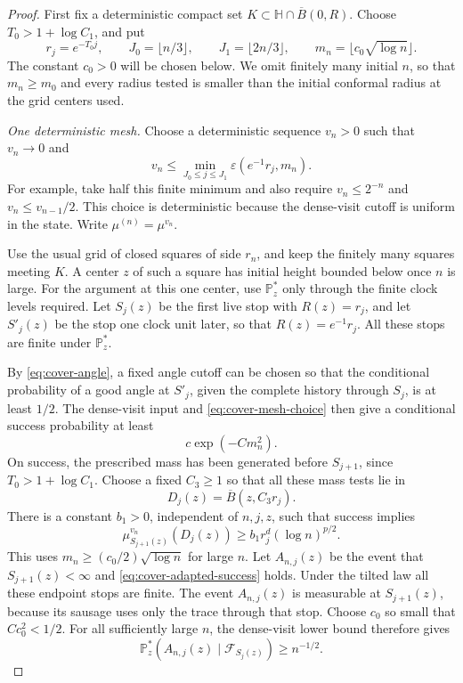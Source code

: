 \documentclass[11pt]{article}
\theoremstyle{definition}
\theoremstyle{remark}
\numberwithin{equation}{section}
\begin{document}
\begin{proof}
First fix a deterministic compact set
\(K\subset\mathbb H\cap\overline B(0,R)\).
Choose \(T_0>1+\log C_1\), and put
\[
 r_j=e^{-T_0j},\qquad
 J_0=\lfloor n/3\rfloor,\qquad J_1=\lfloor2n/3\rfloor,
 \qquad m_n=\lfloor c_0\sqrt{\log n}\rfloor.
\]
The constant \(c_0>0\) will be chosen below.  We omit finitely many
initial \(n\), so that \(m_n\ge m_0\) and every radius tested is
smaller than the initial conformal radius at the grid centers used.

\emph{One deterministic mesh.}
Choose a deterministic sequence \(v_n>0\) such that \(v_n\to0\)
and
\begin{equation}
 v_n\le\min_{J_0\le j\le J_1}
              \varepsilon(e^{-1}r_j,m_n).
 \label{eq:cover-mesh-choice}
\end{equation}
For example, take half this finite minimum and also require
\(v_n\le2^{-n}\) and \(v_n\le v_{n-1}/2\).  This choice is
deterministic because the dense-visit cutoff is uniform in the
state.  Write \(\mu^{(n)}=\mu^{v_n}\).

Use the usual grid of closed squares of side \(r_n\), and keep
the finitely many squares meeting \(K\).  A center \(z\) of such
a square has initial height bounded below once \(n\) is large.
For the argument at this one center, use \(\mathbb P_z^*\) only
through the finite clock levels required.  Let \(S_j(z)\) be the
first live stop with \(R(z)=r_j\), and let \(S'_j(z)\) be the
stop one clock unit later, so that \(R(z)=e^{-1}r_j\).
All these stops are finite under \(\mathbb P_z^*\).

By \eqref{eq:cover-angle}, a fixed angle cutoff can be chosen
so that the conditional probability of a good angle at \(S'_j\),
given the complete history through \(S_j\), is at least \(1/2\).
The dense-visit input and \eqref{eq:cover-mesh-choice} then give
a conditional success probability at least
\[
 c\exp(-Cm_n^2).
\]
On success, the prescribed mass has been generated before
\(S_{j+1}\), since \(T_0>1+\log C_1\).  Choose a fixed
\(C_3\ge1\) so that all these mass tests lie in
\[
 D_j(z)=\overline B(z,C_3r_j).
\]
There is a constant \(b_1>0\), independent of \(n,j,z\), such that
success implies
\begin{equation}
 \mu_{S_{j+1}(z)}^{v_n}(D_j(z))
     \ge b_1 r_j^d(\log n)^{p/2}.
 \label{eq:cover-adapted-success}
\end{equation}
This uses \(m_n\ge(c_0/2)\sqrt{\log n}\) for large \(n\).
Let \(A_{n,j}(z)\) be the event that \(S_{j+1}(z)<\infty\) and
\eqref{eq:cover-adapted-success} holds. Under the tilted law all these
endpoint stops are finite. The event \(A_{n,j}(z)\) is measurable at
\(S_{j+1}(z)\), because its sausage uses only the trace through that stop.
Choose \(c_0\) so small that \(Cc_0^2<1/2\).  For all sufficiently
large \(n\), the dense-visit lower bound therefore gives
\[
 \mathbb P_z^*\!\left(A_{n,j}(z)\mid\mathcal F_{S_j(z)}\right)
       \ge n^{-1/2}.
\]


\end{proof}
\end{document}
